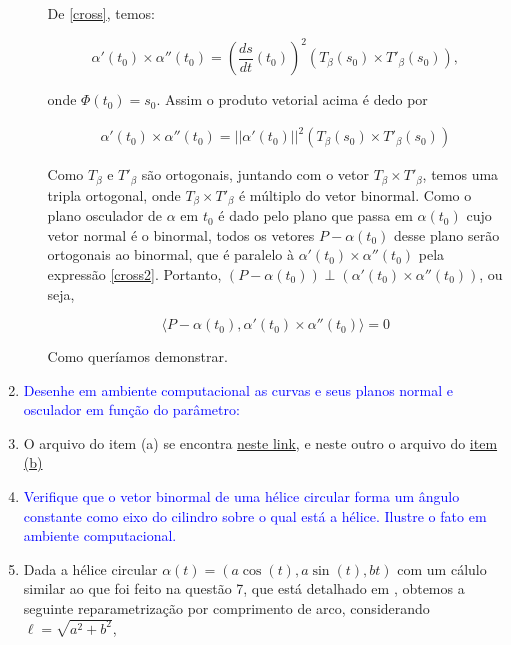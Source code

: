 \documentclass[12pt,letterpaper]{article}
\newcommand{\real}{\mathbb{R}}
\newcommand{\ex}[1]{\textcolor{blue}{\textbf{Exercício #1}}}
\newcommand{\sol}[1]{\textbf{Solução #1}}
\newcommand{\blue}[1]{{\color{blue}{#1}}}
\begin{document}
\begin{enumerate}
\begin{enumerate}[(a)]
	De \ref{cross}, temos:
	
	$$\alpha'(t_0)\times\alpha''(t_0)=\left(\dfrac{ds}{dt}(t_0)\right)^2(T_\beta(s_0)\times T'_\beta(s_0)),$$
	
	onde $\Phi(t_0)=s_0$. Assim o produto vetorial acima é dedo por 
	
	\begin{align}\alpha'(t_0)\times\alpha''(t_0)=||\alpha'(t_0)||^2(T_\beta(s_0)\times T'_\beta(s_0))\label{cross2}\end{align}
	
	Como $T_\beta$ e $T'_\beta$ são ortogonais, juntando com o vetor $T_\beta\times T'_\beta$, temos uma tripla ortogonal, onde $T_\beta\times T'_\beta$ é múltiplo do vetor binormal. Como o plano osculador de $\alpha$ em $t_0$ é dado pelo plano que passa em $\alpha(t_0)$ cujo vetor normal é o binormal, todos os vetores $P-\alpha(t_0)$ desse plano serão ortogonais ao binormal, que é paralelo à $\alpha'(t_0)\times\alpha''(t_0)$ pela expressão \ref{cross2}. Portanto, $(P-\alpha(t_0))\perp(\alpha'(t_0)\times\alpha''(t_0))$, ou seja,
	
	$$\langle P-\alpha(t_0),\alpha'(t_0)\times \alpha''(t_0)\rangle=0$$
	
	Como queríamos demonstrar.
	\end{enumerate}
	
	\item[\ex{9}]\textcolor{blue}{Desenhe em ambiente computacional as curvas e seus planos normal e osculador em função do parâmetro:}
	
	\begin{enumerate}[(a)]
		\blue{\item $\alpha(t) = (3t-t^3,3t^2,3t+t^3),t\in\real$
		\item $(a\cos(t) +b\sin(t),a\sin(t) +b\cos(t),c\sin(2t)),t\in\real$}
	\end{enumerate}

	\item[\sol{9}] O arquivo do item (a) se encontra \href{https://github.com/reneroliveira/Curves_and_Surfaces/blob/main/ggb_files/L4_ex9a.ggb}{neste link}, e neste outro o arquivo do  \href{https://github.com/reneroliveira/Curves_and_Surfaces/blob/main/ggb_files/L4_exb.ggb}{item (b)}
	\item[\ex{10}]\textcolor{blue}{Verifique que o vetor binormal de uma hélice circular forma um ângulo constante como eixo do cilindro sobre o qual está a hélice. Ilustre o fato em ambiente computacional.}
	
	\item[\sol{10}] Dada a hélice circular $\alpha(t)=(a\cos(t),a\sin(t),bt)$ com um cálulo similar ao que foi feito na questão 7, que está detalhado em \cite{ronaldo}, obtemos a seguinte reparametrização por comprimento de arco, considerando $\ell=\sqrt{a^2+b^2}$,
	

\end{enumerate}
\end{document}
